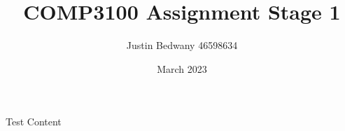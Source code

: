 \documentclass[12pt, letterpaper]{article}
\title{COMP3100 Assignment Stage 1}
\author{Justin Bedwany 46598634}
\date{March 2023}
\begin{document}
\maketitle
Test Content
\end{document}

